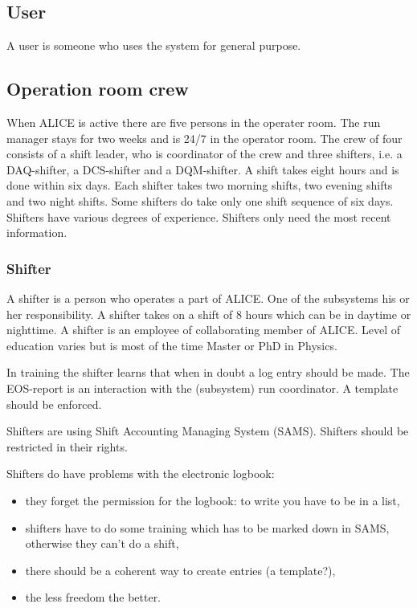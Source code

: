 \subsection{User}
A user is someone who uses the system for general purpose.

\subsection{Operation room crew}
When ALICE is active there are five persons in the operater room. The run manager stays for two weeks and is 24/7 in the operator room. The crew of four consists of a shift leader, who is coordinator of the crew and three shifters, i.e. a DAQ-shifter, a DCS-shifter and a DQM-shifter. A shift takes eight hours and is done within six days. Each shifter takes two morning shifts, two evening shifts and two night shifts. Some shifters do take only one shift sequence of six days. Shifters have various degrees of experience. Shifters only need the most recent information. 

\subsubsection{Shifter}
A shifter is a person who operates a part of ALICE. One of the subsystems his or her responsibility. A shifter takes on a shift of 8 hours which can be in daytime or nighttime. A shifter is an employee of collaborating member of ALICE. Level of education varies but is most of the time Master or PhD in Physics.

In training the shifter learns that when in doubt a log entry should be made. The EOS-report is an interaction with the (subsystem) run coordinator. A template should be enforced. 

Shifters are using Shift Accounting Managing System (SAMS). Shifters should be restricted in their rights. 

Shifters do have problems with the electronic logbook:
\begin{itemize}
  \item they forget the permission for the logbook: to write you have to be in a list,
  \item shifters have to do some training which has to be marked down in SAMS, otherwise they can't do a shift,
  \item there should be a coherent way to create entries (a template?),
  \item the less freedom the better.
\end{itemize}

